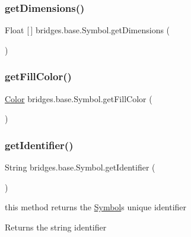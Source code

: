 \subsubsection{\texorpdfstring{getDimensions()}{getDimensions()}}
{\footnotesize\ttfamily Float \mbox{[}$\,$\mbox{]} bridges.\+base.\+Symbol.\+get\+Dimensions (\begin{DoxyParamCaption}{ }\end{DoxyParamCaption})}

\mbox{\label{classbridges_1_1base_1_1_symbol_aed2e531266c8a3bc563709c6486380cc}} 
\subsubsection{\texorpdfstring{getFillColor()}{getFillColor()}}
{\footnotesize\ttfamily \mbox{\hyperlink{classbridges_1_1base_1_1_color}{Color}} bridges.\+base.\+Symbol.\+get\+Fill\+Color (\begin{DoxyParamCaption}{ }\end{DoxyParamCaption})}

\mbox{\label{classbridges_1_1base_1_1_symbol_a53cea862b06ffc230ca68d4d34c8820d}} 
\subsubsection{\texorpdfstring{getIdentifier()}{getIdentifier()}}
{\footnotesize\ttfamily String bridges.\+base.\+Symbol.\+get\+Identifier (\begin{DoxyParamCaption}{ }\end{DoxyParamCaption})}

this method returns the \mbox{\hyperlink{classbridges_1_1base_1_1_symbol}{Symbol}}\textquotesingle{}s unique identifier \begin{DoxyReturn}{Returns}
the string identifier 
\end{DoxyReturn}
\mbox{\label{classbridges_1_1base_1_1_symbol_aeba4cfa5b39fe03e72a568a8b7452e60}} 
